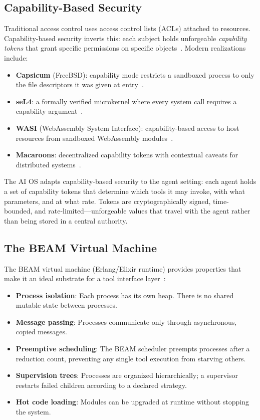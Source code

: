 \documentclass[12pt,a4paper]{article}
\theoremstyle{plain}
\theoremstyle{definition}
\begin{document}
\subsection{Capability-Based Security}

Traditional access control uses access control lists (ACLs) attached to resources. Capability-based security inverts this: each subject holds unforgeable \emph{capability tokens} that grant specific permissions on specific objects~\citep{dennis1966capabilities,levy1984capability}. Modern realizations include:

\begin{itemize}[leftmargin=2em]
\item \textbf{Capsicum} (FreeBSD): capability mode restricts a sandboxed process to only the file descriptors it was given at entry~\citep{watson2010capsicum}.
\item \textbf{seL4}: a formally verified microkernel where every system call requires a capability argument~\citep{klein2009sel4}.
\item \textbf{WASI} (WebAssembly System Interface): capability-based access to host resources from sandboxed WebAssembly modules~\citep{wasi2023spec}.
\item \textbf{Macaroons}: decentralized capability tokens with contextual caveats for distributed systems~\citep{birgisson2014macaroons}.
\end{itemize}

The AI OS adapts capability-based security to the agent setting: each agent holds a set of capability tokens that determine which tools it may invoke, with what parameters, and at what rate. Tokens are cryptographically signed, time-bounded, and rate-limited---unforgeable values that travel with the agent rather than being stored in a central authority.

\subsection{The BEAM Virtual Machine}

The BEAM virtual machine (Erlang/Elixir runtime) provides properties that make it an ideal substrate for a tool interface layer~\citep{armstrong2003erlang,juric2019elixir}:

\begin{itemize}[leftmargin=2em]
\item \textbf{Process isolation}: Each process has its own heap. There is no shared mutable state between processes.
\item \textbf{Message passing}: Processes communicate only through asynchronous, copied messages.
\item \textbf{Preemptive scheduling}: The BEAM scheduler preempts processes after a reduction count, preventing any single tool execution from starving others.
\item \textbf{Supervision trees}: Processes are organized hierarchically; a supervisor restarts failed children according to a declared strategy.
\item \textbf{Hot code loading}: Modules can be upgraded at runtime without stopping the system.
\end{itemize}
\end{document}
